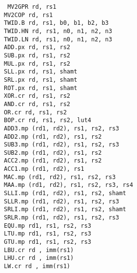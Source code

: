 {\tt
MV2GPR      rd, rs1                 \\
MV2COP      rd, rs1                 \\
TWID.B      rd, rs1, b0, b1, b2, b3 \\
TWID.HN     rd, rs1, n0, n1, n2, n3 \\
TWID.LN     rd, rs1, n0, n1, n2, n3 \\
ADD.px      rd, rs1, rs2            \\
SUB.px      rd, rs1, rs2            \\
MUL.px      rd, rs1, rs2            \\
SLL.px      rd, rs1, shamt          \\
SRL.px      rd, rs1, shamt          \\
ROT.px      rd, rs1, shamt          \\
XOR.cr      rd, rs1, rs2            \\
AND.cr      rd, rs1, rs2            \\
OR.cr       rd, rs1, rs2            \\
BOP.cr      rd, rs1, rs2, lut4      \\
ADD3.mp     (rd1, rd2),  rs1, rs2, rs3 \\
ADD2.mp     (rd1, rd2),  rs1, rs2  \\
SUB3.mp     (rd1, rd2),  rs1, rs2, rs3 \\
SUB2.mp     (rd1, rd2),  rs1, rs2  \\
ACC2.mp     (rd1, rd2),  rs1, rs2  \\
ACC1.mp     (rd1, rd2),  rs1       \\
MAC.mp      (rd1, rd2),  rs1, rs2, rs3 \\
MAA.mp      (rd1, rd2),  rs1, rs2, rs3, rs4 \\
SLLI.mp     (rd1, rd2),  rs1, rs2, shamt \\
SLLR.mp     (rd1, rd2),  rs1, rs2, rs3 \\
SRLI.mp     (rd1, rd2),  rs1, rs2, shamt \\
SRLR.mp     (rd1, rd2),  rs1, rs2, rs3 \\
EQU.mp      rd1,         rs1, rs2, rs3 \\
LTU.mp      rd1,         rs1, rs2, rs3 \\
GTU.mp      rd1,         rs1, rs2, rs3 \\
LBU.cr      rd , imm(rs1)           \\
LHU.cr      rd , imm(rs1)           \\
LW.cr       rd , imm(rs1)           \\
}

